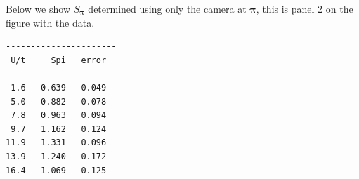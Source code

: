\documentclass[11pt,letter]{article}
\newcommand{\bv}[1]{\ensuremath{\bm{#1}}}
\newcommand{\iisat}{\ensuremath{I_{\mathrm{p}}/I_{\mathrm{sat}}}}
\begin{document}
Below we show $S_{\bv{\pi}}$ determined using only the camera at $\bv{\pi}$, this is panel 2 on the figure with the data.   

\begin{verbatim}
----------------------
 U/t     Spi   error
----------------------
 1.6   0.639   0.049
 5.0   0.882   0.078
 7.8   0.963   0.094
 9.7   1.162   0.124
11.9   1.331   0.096
13.9   1.240   0.172
16.4   1.069   0.125
\end{verbatim}
 



\newpage 


\end{document}
